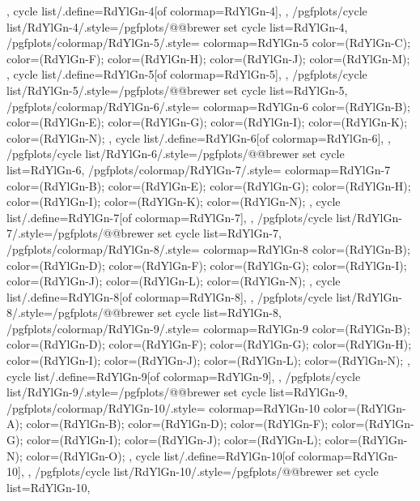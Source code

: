 {{{    },
    cycle list/.define={RdYlGn-4}{[of colormap=RdYlGn-4]},
  },
  /pgfplots/cycle list/RdYlGn-4/.style={/pgfplots/@@brewer set cycle list={RdYlGn-4}},
  /pgfplots/colormap/RdYlGn-5/.style={
    colormap={RdYlGn-5}{
      color=(RdYlGn-C);
      color=(RdYlGn-F);
      color=(RdYlGn-H);
      color=(RdYlGn-J);
      color=(RdYlGn-M);
    },
    cycle list/.define={RdYlGn-5}{[of colormap=RdYlGn-5]},
  },
  /pgfplots/cycle list/RdYlGn-5/.style={/pgfplots/@@brewer set cycle list={RdYlGn-5}},
  /pgfplots/colormap/RdYlGn-6/.style={
    colormap={RdYlGn-6}{
      color=(RdYlGn-B);
      color=(RdYlGn-E);
      color=(RdYlGn-G);
      color=(RdYlGn-I);
      color=(RdYlGn-K);
      color=(RdYlGn-N);
    },
    cycle list/.define={RdYlGn-6}{[of colormap=RdYlGn-6]},
  },
  /pgfplots/cycle list/RdYlGn-6/.style={/pgfplots/@@brewer set cycle list={RdYlGn-6}},
  /pgfplots/colormap/RdYlGn-7/.style={
    colormap={RdYlGn-7}{
      color=(RdYlGn-B);
      color=(RdYlGn-E);
      color=(RdYlGn-G);
      color=(RdYlGn-H);
      color=(RdYlGn-I);
      color=(RdYlGn-K);
      color=(RdYlGn-N);
    },
    cycle list/.define={RdYlGn-7}{[of colormap=RdYlGn-7]},
  },
  /pgfplots/cycle list/RdYlGn-7/.style={/pgfplots/@@brewer set cycle list={RdYlGn-7}},
  /pgfplots/colormap/RdYlGn-8/.style={
    colormap={RdYlGn-8}{
      color=(RdYlGn-B);
      color=(RdYlGn-D);
      color=(RdYlGn-F);
      color=(RdYlGn-G);
      color=(RdYlGn-I);
      color=(RdYlGn-J);
      color=(RdYlGn-L);
      color=(RdYlGn-N);
    },
    cycle list/.define={RdYlGn-8}{[of colormap=RdYlGn-8]},
  },
  /pgfplots/cycle list/RdYlGn-8/.style={/pgfplots/@@brewer set cycle list={RdYlGn-8}},
  /pgfplots/colormap/RdYlGn-9/.style={
    colormap={RdYlGn-9}{
      color=(RdYlGn-B);
      color=(RdYlGn-D);
      color=(RdYlGn-F);
      color=(RdYlGn-G);
      color=(RdYlGn-H);
      color=(RdYlGn-I);
      color=(RdYlGn-J);
      color=(RdYlGn-L);
      color=(RdYlGn-N);
    },
    cycle list/.define={RdYlGn-9}{[of colormap=RdYlGn-9]},
  },
  /pgfplots/cycle list/RdYlGn-9/.style={/pgfplots/@@brewer set cycle list={RdYlGn-9}},
  /pgfplots/colormap/RdYlGn-10/.style={
    colormap={RdYlGn-10}{
      color=(RdYlGn-A);
      color=(RdYlGn-B);
      color=(RdYlGn-D);
      color=(RdYlGn-F);
      color=(RdYlGn-G);
      color=(RdYlGn-I);
      color=(RdYlGn-J);
      color=(RdYlGn-L);
      color=(RdYlGn-N);
      color=(RdYlGn-O);
    },
    cycle list/.define={RdYlGn-10}{[of colormap=RdYlGn-10]},
  },
  /pgfplots/cycle list/RdYlGn-10/.style={/pgfplots/@@brewer set cycle list={RdYlGn-10}},
}
